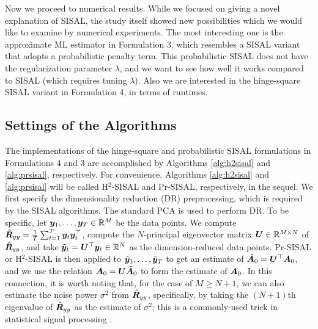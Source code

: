 \documentclass[10pt,twocolumn,twoside]{IEEEtran}
\begin{document}
Now we proceed to numerical results.
While we focused on giving a novel explanation of SISAL,
the study itself showed new possibilities which we would like to examine by numerical experiments.
The most interesting one is the approximate ML estimator in Formulation 3, which resembles a SISAL variant that adopts a probabilistic penalty term.
This probabilistic SISAL does not have the regularization parameter $\lambda$,
and we want to see how well it works compared to SISAL (which requires tuning $\lambda$).
Also we are interested in the hinge-square SISAL variant in Formulation 4, in terms of runtimes.

\subsection{Settings of the Algorithms}
\label{sect:sim_settings}

The implementations of the hinge-square and probabilistic SISAL formulations in Formulations 4 and 3 are accomplished by Algorithms \ref{alg:h2sisal} and \ref{alg:prsisal}, respectively.
For convenience, Algorithms \ref{alg:h2sisal} and \ref{alg:prsisal} will be called H$^2$-SISAL and Pr-SISAL, respectively, in the sequel.
We first specify the dimensionality reduction (DR) preprocessing, which is required by the SISAL algorithms.
The standard PCA is used to perform DR.
To be specific, let ${\bm y}_1,\ldots,{\bm y}_T \in \mathbb{R}^M$ be the data points.
We compute $\hat{{\bm R}}_{yy} = \frac{1}{T} \sum_{t=1}^T {\bm y}_t {\bm y}_t^\top$, compute the $N$-principal eigenvector matrix ${\bm U} \in \mathbb{R}^{M \times N}$ of $\hat{{\bm R}}_{yy}$, and take $\tilde{{\bm y}}_t = {\bm U}^\top {\bm y}_t \in \mathbb{R}^N$ as the dimension-reduced data points.
Pr-SISAL or H$^2$-SISAL is then applied to $\tilde{{\bm y}}_1,\ldots,\tilde{{\bm y}}_T$ to get an estimate of $\tilde{{\bm A}}_0=  {\bm U}^\top {\bm A}_0$, and we use the relation ${\bm A}_0 = {\bm U} \tilde{{\bm A}}_0$ to form the estimate of ${\bm A}_0$.
In this connection, it is worth noting that, for the case of $M \geq N+1$, we can also estimate the noise power $\sigma^2$ from $\hat{{\bm R}}_{yy}$, specifically, by taking the $(N+1)$th eigenvalue of $\hat{{\bm R}}_{yy}$ as the estimate of $\sigma^2$; this is a commonly-used trick in statistical signal processing \cite[Chapter~4.5]{stoica2005spectral}.
\end{document}
